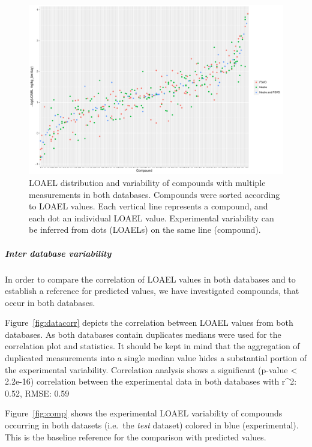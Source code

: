 \documentclass[]{achemso}
\let\oldsubparagraph\subparagraph
\renewcommand{\subparagraph}[1]{\oldsubparagraph{#1}\mbox{}}
\begin{document}
\begin{figure}
\centering
\includegraphics{figures/dataset-variability.pdf}
\caption{LOAEL distribution and variability of compounds with multiple
measurements in both databases. Compounds were sorted according to LOAEL
values. Each vertical line represents a compound, and each dot an
individual LOAEL value. Experimental variability can be inferred from
dots (LOAELs) on the same line (compound).}\label{fig:intra}
\end{figure}

\subparagraph{Inter database
variability}\label{inter-database-variability}

In order to compare the correlation of LOAEL values in both databases
and to establish a reference for predicted values, we have investigated
compounds, that occur in both databases.

Figure~\ref{fig:datacorr} depicts the correlation between LOAEL values
from both databases. As both databases contain duplicates medians were
used for the correlation plot and statistics. It should be kept in mind
that the aggregation of duplicated measurements into a single median
value hides a substantial portion of the experimental variability.
Correlation analysis shows a significant (p-value \textless{} 2.2e-16)
correlation between the experimental data in both databases with r\^{}2:
0.52, RMSE: 0.59

Figure~\ref{fig:comp} shows the experimental LOAEL variability of
compounds occurring in both datasets (i.e.~the \emph{test} dataset)
colored in blue (experimental). This is the baseline reference for the
comparison with predicted values.
\end{document}
